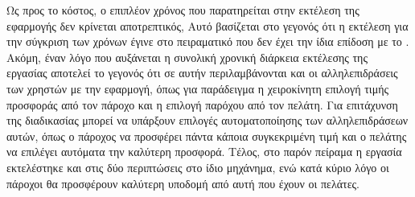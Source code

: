Ως προς το κόστος, ο επιπλέον χρόνος που παρατηρείται στην εκτέλεση της εφαρμογής δεν κρίνεται αποτρεπτικός, Αυτό βασίζεται στο γεγονός ότι η εκτέλεση για την σύγκριση των χρόνων έγινε στο πειραματικό  που δεν έχει την ίδια επίδοση με το . Ακόμη, έναν λόγο που αυξάνεται η συνολική χρονική διάρκεια εκτέλεσης της εργασίας αποτελεί το γεγονός ότι σε αυτήν περιλαμβάνονται και οι αλληλεπιδράσεις των χρηστών με την εφαρμογή, όπως για παράδειγμα η χειροκίνητη επιλογή τιμής προσφοράς από τον πάροχο και η επιλογή παρόχου από τον πελάτη. Για επιτάχυνση της διαδικασίας μπορεί να υπάρξουν επιλογές αυτοματοποίησης των αλληλεπιδράσεων αυτών, όπως ο πάροχος να προσφέρει πάντα κάποια συγκεκριμένη τιμή και ο πελάτης να επιλέγει αυτόματα την καλύτερη προσφορά. Τέλος, στο παρόν πείραμα η εργασία εκτελέστηκε και στις δύο περιπτώσεις στο ίδιο μηχάνημα, ενώ κατά κύριο λόγο οι πάροχοι θα προσφέρουν καλύτερη υποδομή από αυτή που έχουν οι πελάτες. 